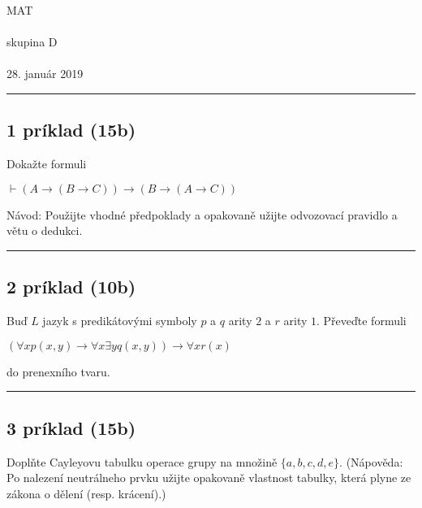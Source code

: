 \documentclass[11pt,a4paper]{article}
\begin{document}
\begin{center}
  \begin{bf}
    \Huge{MAT}\\[-0.5em]
    {\normalsize{}}\\[0.5em]

    \Large{skupina D}\\[-0.25em]
    {\normalsize{}}\\[1em]

    28. január 2019
  \end{bf}
\end{center}

\hrule

\subsection*{1 príklad (15b)}

  Dokažte formuli

  \begin{center}
    $\vdash (A \rightarrow (B \rightarrow C)) \rightarrow (B \rightarrow (A \rightarrow C))$
  \end{center}

  Návod: Použijte vhodné předpoklady a opakovaně užijte odvozovací pravidlo a větu o dedukci.\\

  \hrule

\subsection*{2 príklad (10b)}

  Buď $L$ jazyk s predikátovými symboly $p$ a $q$ arity $2$ a $r$ arity $1$. Převeďte formuli

  \begin{center}
    $(\forall x p(x,y) \rightarrow \forall x \exists y q(x,y)) \rightarrow \forall x r(x)$
  \end{center}

  do prenexního tvaru.\\

  \hrule

\subsection*{3 príklad (15b)}

  Doplňte Cayleyovu tabulku operace grupy na množině $\{a,b,c,d,e\}$. (Nápověda: Po nalezení neutrálneho prvku užijte opakovaně vlastnost tabulky, která plyne ze zákona o dělení (resp. krácení).)
\end{document}
